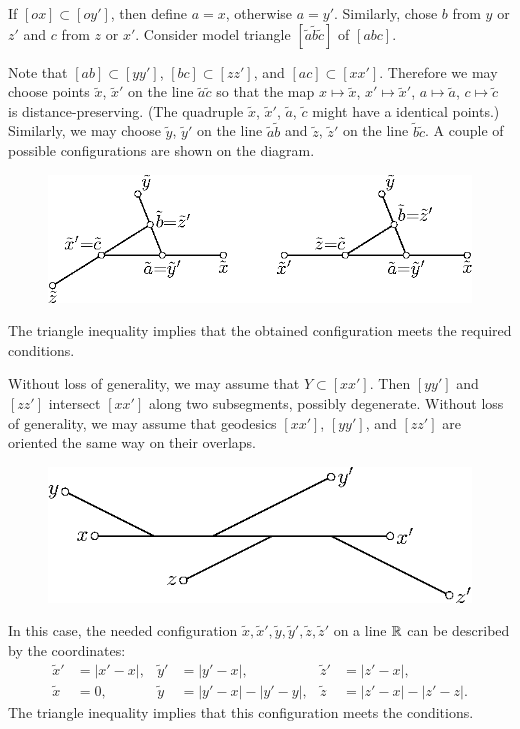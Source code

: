 \documentclass{article}
\begin{document}
If $[ox]\subset [oy']$, then define $a=x$, otherwise $a=y'$.
Similarly, chose  $b$ from $y$ or $z'$ and $c$ from $z$ or $x'$.
Consider model triangle $[\tilde a\tilde b\tilde c]$ of $[abc]$.

Note that $[ab]\subset [yy']$, $[bc]\subset [zz']$, and $[ac]\subset [xx']$.
Therefore we may choose points $\tilde x$, $\tilde x'$ on the line $\tilde a\tilde c$ so that the map $x\mapsto \tilde x$, $x'\mapsto \tilde x'$, $a\mapsto \tilde a$, $c\mapsto \tilde c$ is distance-preserving.
(The quadruple $\tilde x$, $\tilde x'$, $\tilde a$, $\tilde c$ might have a identical points.)
Similarly, we may choose $\tilde y$, $\tilde y'$ on the line $\tilde a\tilde b$ and $\tilde z$, $\tilde z'$ on the line $\tilde b\tilde c$.
A couple of possible configurations are shown on the diagram.

\begin{figure}[ht!]
\centering
\includegraphics{mppics/pic-50}
\end{figure}

The triangle inequality implies that the obtained configuration meets the required conditions.

Without loss of generality, we may assume that $Y\subset [xx']$.
Then $[yy']$ and $[zz']$ intersect $[xx']$ along two subsegments, possibly degenerate.
Without loss of generality, we may assume that geodesics $[xx']$, $[yy']$, and $[zz']$ are oriented the same way on their overlaps.

\begin{figure}[ht!]
\centering
\includegraphics{mppics/pic-60}
\end{figure}

In this case, the needed configuration $\tilde x,\tilde x',\tilde y,\tilde y',\tilde z,\tilde z'$ on a line $\mathbb{R}$ can be described by the coordinates:
\begin{align*}
\tilde x'&=|x'-x|,
&
\tilde y'&=|y'-x|,
&
\tilde z'&=|z'-x|,
\\
\tilde x&=0,
&
\tilde y&=|y'-x|-|y'-y|,
&
\tilde z&=|z'-x|-|z'-z|.
\end{align*}
The triangle inequality implies that this configuration meets the conditions. 
\end{document}
